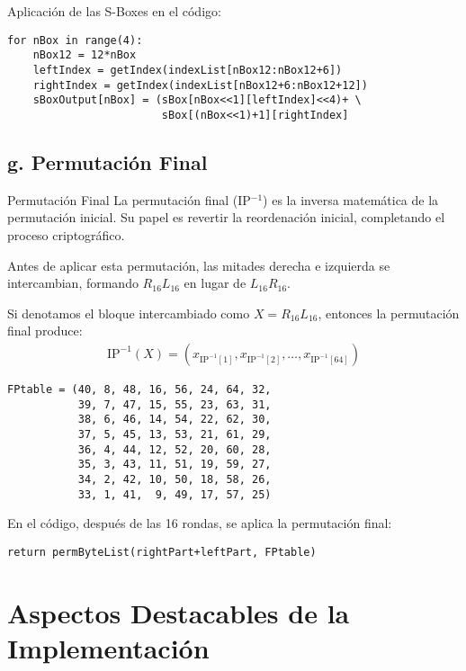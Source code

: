 Aplicación de las S-Boxes en el código:

\begin{lstlisting}[style=cryptoalgo]
for nBox in range(4):
    nBox12 = 12*nBox
    leftIndex = getIndex(indexList[nBox12:nBox12+6])
    rightIndex = getIndex(indexList[nBox12+6:nBox12+12])
    sBoxOutput[nBox] = (sBox[nBox<<1][leftIndex]<<4)+ \
                        sBox[(nBox<<1)+1][rightIndex]
\end{lstlisting}

\subsection{g. Permutación Final}

\begin{cryptomethod}{Permutación Final}
	La permutación final (IP$^{-1}$) es la inversa matemática de la permutación inicial. Su papel es revertir la reordenación inicial, completando el proceso criptográfico.

	Antes de aplicar esta permutación, las mitades derecha e izquierda se intercambian, formando $R_{16}L_{16}$ en lugar de $L_{16}R_{16}$.

	Si denotamos el bloque intercambiado como $X = R_{16}L_{16}$, entonces la permutación final produce:
	\begin{align}
		\text{IP}^{-1}(X) = (x_{\text{IP}^{-1}[1]}, x_{\text{IP}^{-1}[2]}, \ldots, x_{\text{IP}^{-1}[64]})
	\end{align}
\end{cryptomethod}

\begin{lstlisting}[style=cryptoalgo, caption={Tabla de Permutación Final}, label=lst:permutacion-final]
FPtable = (40, 8, 48, 16, 56, 24, 64, 32,
           39, 7, 47, 15, 55, 23, 63, 31,
           38, 6, 46, 14, 54, 22, 62, 30,
           37, 5, 45, 13, 53, 21, 61, 29,
           36, 4, 44, 12, 52, 20, 60, 28,
           35, 3, 43, 11, 51, 19, 59, 27,
           34, 2, 42, 10, 50, 18, 58, 26,
           33, 1, 41,  9, 49, 17, 57, 25)
\end{lstlisting}

En el código, después de las 16 rondas, se aplica la permutación final:

\begin{lstlisting}[style=cryptoalgo]
return permByteList(rightPart+leftPart, FPtable)
\end{lstlisting}

\section{Aspectos Destacables de la Implementación}

